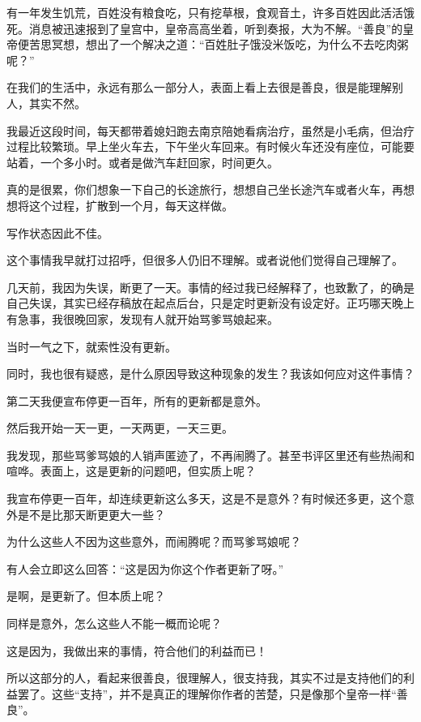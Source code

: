 \begin{this_body} %

有一年发生饥荒，百姓没有粮食吃，只有挖草根，食观音土，许多百姓因此活活饿死。消息被迅速报到了皇宫中，皇帝高高坐着，听到奏报，大为不解。“善良”的皇帝便苦思冥想，想出了一个解决之道：“百姓肚子饿没米饭吃，为什么不去吃肉粥呢？”

在我们的生活中，永远有那么一部分人，表面上看上去很是善良，很是能理解别人，其实不然。

我最近这段时间，每天都带着媳妇跑去南京陪她看病治疗，虽然是小毛病，但治疗过程比较繁琐。早上坐火车去，下午坐火车回来。有时候火车还没有座位，可能要站着，一个多小时。或者是做汽车赶回家，时间更久。

真的是很累，你们想象一下自己的长途旅行，想想自己坐长途汽车或者火车，再想想将这个过程，扩散到一个月，每天这样做。

写作状态因此不佳。

这个事情我早就打过招呼，但很多人仍旧不理解。或者说他们觉得自己理解了。

几天前，我因为失误，断更了一天。事情的经过我已经解释了，也致歉了，的确是自己失误，其实已经存稿放在起点后台，只是定时更新没有设定好。正巧哪天晚上有急事，我很晚回家，发现有人就开始骂爹骂娘起来。

当时一气之下，就索性没有更新。

同时，我也很有疑惑，是什么原因导致这种现象的发生？我该如何应对这件事情？

第二天我便宣布停更一百年，所有的更新都是意外。

然后我开始一天一更，一天两更，一天三更。

我发现，那些骂爹骂娘的人销声匿迹了，不再闹腾了。甚至书评区里还有些热闹和喧哗。表面上，这是更新的问题吧，但实质上呢？

我宣布停更一百年，却连续更新这么多天，这是不是意外？有时候还多更，这个意外是不是比那天断更更大一些？

为什么这些人不因为这些意外，而闹腾呢？而骂爹骂娘呢？

有人会立即这么回答：“这是因为你这个作者更新了呀。”

是啊，是更新了。但本质上呢？

同样是意外，怎么这些人不能一概而论呢？

这是因为，我做出来的事情，符合他们的利益而已！

所以这部分的人，看起来很善良，很理解人，很支持我，其实不过是支持他们的利益罢了。这些“支持”，并不是真正的理解你作者的苦楚，只是像那个皇帝一样“善良”。


\end{this_body}
